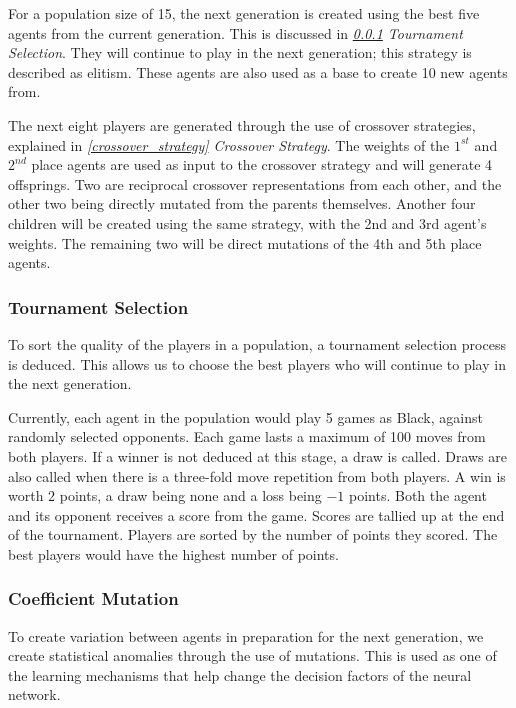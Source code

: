 \documentclass[12pt,a4paper]{article}
\begin{document}
            For a population size of 15, the next generation is created using the best five agents from the current generation. This is discussed in {\it{\ref{tournament_selection} Tournament Selection}}. 
            They will continue to play in the next generation; this strategy is described as elitism. These agents are also used as a base to create 10 new agents from. 
            
            The next eight players are generated through the use of crossover strategies, explained in {\it{\ref{crossover_strategy} Crossover Strategy}}. The weights of the $1^{st}$ and $2^{nd}$ place agents are used as input to the crossover strategy and will generate 4 offsprings. Two are reciprocal crossover representations from each other, and the other two being directly mutated from the parents themselves. Another four children will be created using the same strategy, with the 2nd and 3rd agent's weights. The remaining two will be direct mutations of the 4th and 5th place agents.

        \subsubsection{Tournament Selection} \label{tournament_selection}

            To sort the quality of the players in a population, a tournament selection process is deduced. This allows us to choose the best players who will continue to play in the next generation.

            Currently, each agent in the population would play 5 games as Black, against randomly selected opponents. Each game lasts a maximum of 100 moves from both players. If a winner is not deduced at this stage, a draw is called. Draws are also called when there is a three-fold move repetition from both players. A win is worth $2$ points, a draw being none and a loss being $-1$ points. Both the agent and its opponent receives a score from the game.
            Scores are tallied up at the end of the tournament. Players are sorted by the number of points they scored. The best players would have the highest number of points.
            
        \subsubsection{Coefficient Mutation} \label{coefficient_mutation}

            To create variation between agents in preparation for the next generation, we create statistical anomalies through the use of mutations. This is used as one of the learning mechanisms that help change the decision factors of the neural network.
\end{document}
